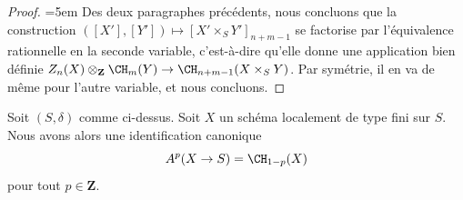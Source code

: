\begin{proof}
{\emergencystretch=5em\medskip\noindent
Des deux paragraphes précédents, nous concluons que
la construction $([X'], [Y']) \mapsto [X' \times_S Y']_{n + m - 1}$
se factorise par l'équivalence rationnelle en la seconde variable, c'est-à-dire
qu'elle donne une application bien définie
$Z_n(X) \otimes_{\mathbf{Z}} \CH_m(Y) \to \CH_{n + m - 1}(X \times_S Y)$.
Par symétrie, il en va de même pour l'autre variable, et nous concluons.\par}
\end{proof}

\begin{lemma}
\label{lemma-chow-cohomology-towards-base-dim-1}
Soit $(S, \delta)$ comme ci-dessus. Soit $X$ un schéma localement de type fini
sur $S$. Nous avons alors une identification canonique
$$
A^p(X \to S) = \CH_{1 - p}(X)
$$
pour tout $p \in \mathbf{Z}$.
\end{lemma}

